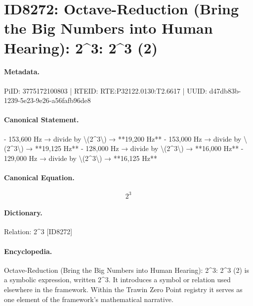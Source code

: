 \section*{ID8272: Octave-Reduction (Bring the Big Numbers into Human Hearing): 2\textasciicircum{}3: 2\textasciicircum{}3 (2)}
\paragraph{Metadata.}
PiID: 3775172100803 | RTEID: RTE:P32122.0130:T2.6617 | UUID: d47db83b-1239-5e23-9e26-a56fafb96de8

\paragraph{Canonical Statement.}
- 153,600 Hz → divide by \textbackslash{}(2\textasciicircum{}3\textbackslash{}) → **19,200 Hz** - 153,000 Hz → divide by \textbackslash{}(2\textasciicircum{}3\textbackslash{}) → **19,125 Hz** - 128,000 Hz → divide by \textbackslash{}(2\textasciicircum{}3\textbackslash{}) → **16,000 Hz** - 129,000 Hz → divide by \textbackslash{}(2\textasciicircum{}3\textbackslash{}) → **16,125 Hz**

\paragraph{Canonical Equation.}
\[
2^3
\]

\paragraph{Dictionary.}
Relation: 2\textasciicircum{}3 [ID8272]

\paragraph{Encyclopedia.}
Octave-Reduction (Bring the Big Numbers into Human Hearing): 2\textasciicircum{}3: 2\textasciicircum{}3 (2) is a symbolic expression, written 2\textasciicircum{}3. It introduces a symbol or relation used elsewhere in the framework. Within the Trawin Zero Point registry it serves as one element of the framework's mathematical narrative.
